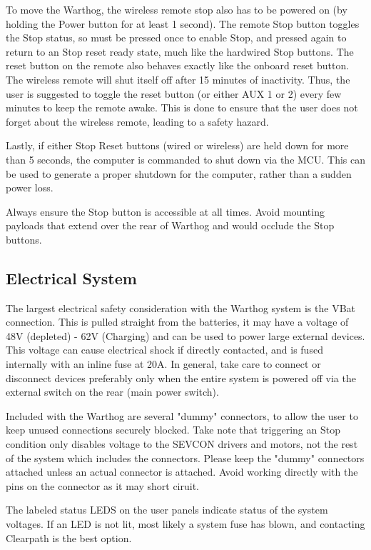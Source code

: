 \documentclass[]{clearpath-latex/clearpath-manual}
\begin{document}
To move the Warthog, the wireless remote stop also has to be powered on (by holding the Power button for at least 1 second). The remote Stop button toggles the Stop status, so must be pressed once to enable Stop, and pressed again to return to an Stop reset ready state, much like the hardwired Stop buttons. The reset button on the remote also behaves exactly like the onboard reset button. The wireless remote will shut itself off after 15 minutes of inactivity. Thus, the user is suggested to toggle the reset button (or either AUX 1 or 2) every few minutes to keep the remote awake. This is done to ensure that the user does not forget about the wireless remote, leading to a safety hazard.

Lastly, if either Stop Reset buttons (wired or wireless) are held down for more than 5 seconds, the computer is commanded to shut down via the MCU. This can be used to generate a proper shutdown for the computer, rather than a sudden power loss.

Always ensure the Stop button is accessible at all times. Avoid mounting payloads that extend over the rear of Warthog and would occlude the Stop buttons.

\subsection{Electrical System}

The largest electrical safety consideration with the Warthog system is the VBat connection. This is pulled straight from the batteries, it may have a voltage of 48V (depleted) - 62V (Charging) and can be used to power large external devices. This voltage can cause electrical shock if directly contacted, and is fused internally with an inline fuse at 20A. In general, take care to connect or disconnect devices preferably only when the entire system is powered off via the external switch on the rear (main power switch).

Included with the Warthog are several "dummy" connectors, to allow the user to keep unused connections securely blocked. Take note that triggering an Stop condition only disables voltage to the SEVCON drivers and motors, not the rest of the system which includes the connectors.  Please keep the "dummy" connectors attached unless an actual connector is attached.  Avoid working directly with the pins on the connector as it may short ciruit.

The labeled status LEDS on the user panels indicate status of the system voltages. If an LED is not lit, most likely a system fuse has blown, and contacting Clearpath is the best option.
\end{document}
